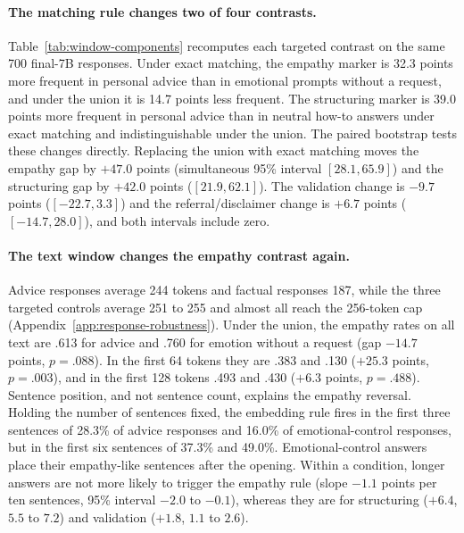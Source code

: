 \documentclass[11pt]{article}
\begin{document}
\paragraph{The matching rule changes two of four contrasts.}
Table~\ref{tab:window-components} recomputes each targeted contrast on the
same 700 final-7B responses. Under exact matching, the empathy marker is
32.3 points more frequent in personal advice than in emotional prompts
without a request, and under the union it is 14.7 points less frequent. The
structuring marker is 39.0 points more frequent in personal advice than in
neutral how-to answers under exact matching and indistinguishable under the
union. The paired bootstrap tests these changes directly. Replacing the union
with exact matching moves the empathy gap by $+47.0$ points (simultaneous 95\%
interval $[28.1,65.9]$) and the structuring gap by $+42.0$ points
($[21.9,62.1]$). The validation change is $-9.7$ points ($[-22.7,3.3]$) and
the referral/disclaimer change is $+6.7$ points ($[-14.7,28.0]$), and both
intervals include zero.

\paragraph{The text window changes the empathy contrast again.}
Advice responses average 244 tokens and factual responses 187, while the
three targeted controls average 251 to 255 and almost all reach the 256-token
cap (Appendix~\ref{app:response-robustness}). Under the union, the empathy
rates on all text are .613 for advice and .760 for emotion without a request
(gap $-14.7$ points, $p=.088$). In the first 64 tokens they are .383 and .130
($+25.3$ points, $p=.003$), and in the first 128 tokens .493 and .430
($+6.3$ points, $p=.488$). Sentence position, and not sentence count,
explains the empathy reversal. Holding the number of sentences fixed, the
embedding rule fires in the first three sentences of 28.3\% of advice
responses and 16.0\% of emotional-control responses, but in the first six
sentences of 37.3\% and 49.0\%. Emotional-control answers place their
empathy-like sentences after the opening. Within a condition, longer answers
are not more likely to trigger the empathy rule (slope $-1.1$ points per ten
sentences, 95\% interval $-2.0$ to $-0.1$), whereas they are for structuring
($+6.4$, $5.5$ to $7.2$) and validation ($+1.8$, $1.1$ to $2.6$).
\end{document}
